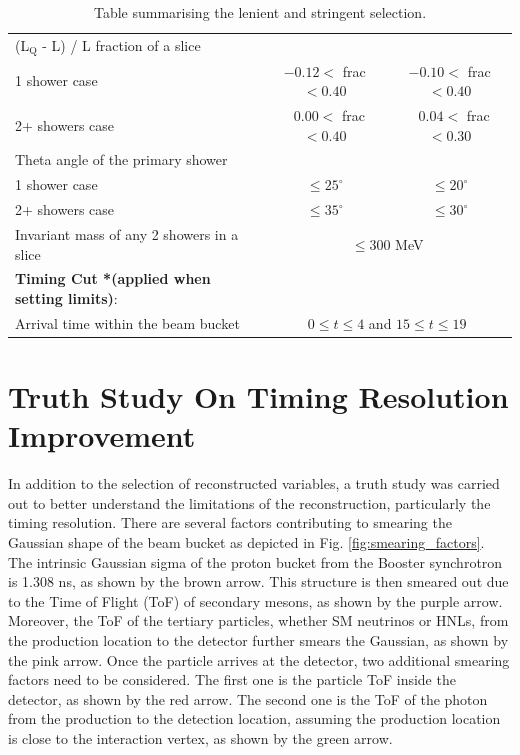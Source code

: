 \begin{table}[htbp!]
\begin{center}
\begin{tabular}{| p{7.75cm} | m{3.25cm} | m{3.25cm} |}
 \cline{2-3}
 (L$_\mathrm{Q}$ - L) / L fraction of a slice &  &  \\
  \hspace{0.5cm} 1 shower case & \multicolumn{1}{c|}{$-0.12 <$ frac $< 0.40$} & \multicolumn{1}{c|}{$-0.10 <$ frac $< 0.40$} \\
  \hspace{0.5cm} 2+ showers case & \multicolumn{1}{c|}{$\ \ \ 0.00 <$ frac $< 0.40$} & \multicolumn{1}{c|}{$\ \ \ 0.04 <$ frac $< 0.30$} \\ [1ex]
  Theta angle of the primary shower &  &  \\
  \hspace{0.5cm}1 shower case & \multicolumn{1}{c|}{$\leq 25^\circ$} & \multicolumn{1}{c|}{$\leq20^\circ$} \\
  \hspace{0.5cm}2+ showers case & \multicolumn{1}{c|}{$\leq 35^\circ$} & \multicolumn{1}{c|}{$\leq 30^\circ$} \\ [1ex]
  \cline{2-3} 
  Invariant mass of any 2 showers in a slice  & \multicolumn{2}{c|}{$\leq 300$ MeV} \\ [1ex]
 \hline
 \textbf{Timing Cut *(applied when setting limits)}: &  \multicolumn{2}{c|}{} \\ [1ex] 
 Arrival time within the beam bucket  & \multicolumn{2}{c|}{$0 \leq t \leq 4$ and $15 \leq t \leq 19$} \\ [1ex]
 \hline
\end{tabular}
\end{center}
\caption{Table summarising the lenient and stringent selection.}
\label{table:cut_summary}
\end{table}


\section{Truth Study On Timing Resolution Improvement}
\label{sec:truth_bucket}

In addition to the selection of reconstructed variables, a truth study was carried out to better understand the limitations of the reconstruction, particularly the timing resolution.
There are several factors contributing to smearing the Gaussian shape of the beam bucket as depicted in Fig. \ref{fig:smearing_factors}.
The intrinsic Gaussian sigma of the proton bucket from the Booster synchrotron is 1.308 ns, as shown by the brown arrow.
This structure is then smeared out due to the Time of Flight (ToF) of secondary mesons, as shown by the purple arrow.
Moreover, the ToF of the tertiary particles, whether SM neutrinos or HNLs, from the production location to the detector further smears the Gaussian, as shown by the pink arrow.
Once the particle arrives at the detector, two additional smearing factors need to be considered.
The first one is the particle ToF inside the detector, as shown by the red arrow.
The second one is the ToF of the photon from the production to the detection location, assuming the production location is close to the interaction vertex, as shown by the green arrow.

